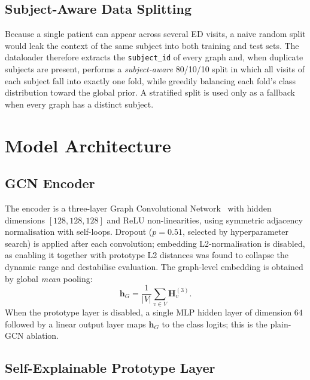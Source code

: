 \subsection{Subject-Aware Data Splitting}

Because a single patient can appear across several ED visits, a naive random
split would leak the context of the same subject into both training and test sets. The
dataloader therefore extracts the \texttt{subject\_id} of every graph and, when
duplicate subjects are present, performs a \emph{subject-aware} 80/10/10 split
in which all visits of each subject fall into exactly one fold, while greedily
balancing each fold's class distribution toward the global prior. A stratified
split is used only as a fallback when every graph has a distinct subject.

\section{Model Architecture}

\subsection{GCN Encoder}

The encoder is a three-layer Graph Convolutional Network~\cite{kipf2017gcn} with hidden
dimensions $[128, 128, 128]$ and ReLU non-linearities, using symmetric adjacency
normalisation with self-loops. Dropout ($p = 0.51$, selected by hyperparameter
search) is applied after each convolution; embedding L2-normalisation is disabled, as enabling it together
with prototype L2 distances was found to collapse the dynamic range and
destabilise evaluation. The graph-level embedding is obtained by global
\emph{mean} pooling:
\[
  \mathbf{h}_G = \frac{1}{|V|}\sum_{v \in V}\mathbf{H}^{(3)}_v .
\]
When the prototype layer is disabled, a single MLP hidden layer of dimension
$64$ followed by a linear output layer maps $\mathbf{h}_G$ to the class logits;
this is the plain-GCN ablation.

\subsection{Self-Explainable Prototype Layer}

